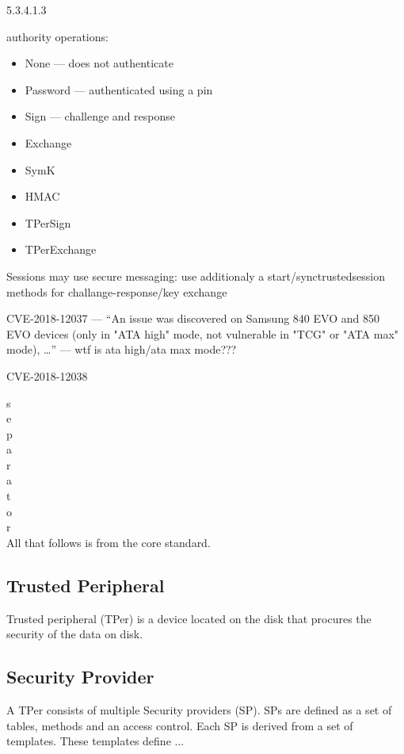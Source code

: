 \documentclass[
  digital, %
  oneside, %
  nolof,     %
  nolot,     %
]{fithesis4}
\begin{document}
5.3.4.1.3

authority operations: 
\begin{itemize}
    \item None --- does not authenticate
    \item Password --- authenticated using a pin
    \item Sign --- challenge and response
    \item Exchange
    \item SymK
    \item HMAC
    \item TPerSign
    \item TPerExchange
\end{itemize}

Sessions may use secure messaging: 
use additionaly a start/synctrustedsession methods for challange-response/key exchange

CVE-2018-12037  --- ``An issue was discovered on Samsung 840 EVO and 850 EVO devices (only in "ATA high" mode, not vulnerable in "TCG" or "ATA max" mode), \dots'' --- wtf is ata high/ata max mode???

CVE-2018-12038


s \\
e \\
p \\
a \\
r \\
a \\
t \\
o \\
r \\



All that follows is from the core standard\cite{tcg-storage-core}.



\hline

\subsection{Trusted Peripheral}

Trusted peripheral (TPer) is a device located on the disk that procures the security of the data on disk.

\subsection{Security Provider}

A TPer consists of multiple Security providers (SP). SPs are defined as a set of tables, methods and an access control. Each SP is derived from a set of templates. These templates define ...
\end{document}
